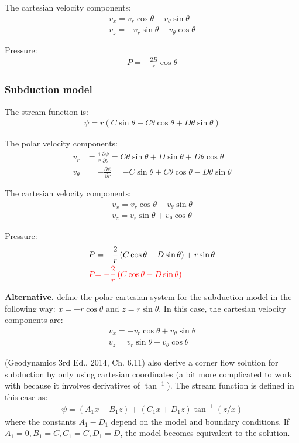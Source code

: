 \documentclass[a4paper,11pt]{article}
\newcommand{\red}[1]{\textcolor{red}{#1}}
\begin{document}
The cartesian velocity components:
\begin{align}
v_x = v_r\cos\theta - v_\theta\sin\theta\\
v_z = -v_r\sin\theta - v_\theta\cos\theta
\end{align}

Pressure:
\begin{align}
P= -\frac{2B}{r}\cos\theta
\end{align}

\subsubsection{Subduction model}
The stream function is:
\begin{align}
\psi = r(C\sin\theta-C\theta\cos\theta+D\theta\sin\theta)
\end{align}

The polar velocity components:
\begin{align}
 v_r&= \frac{1}{r}\frac{\partial\psi}{\partial\theta} = C\theta\sin\theta+D\sin\theta+D\theta\cos\theta\\
v_\theta&=-\frac{\partial\psi}{\partial r} = -C\sin\theta+C\theta\cos\theta-D\theta\sin\theta
 \end{align}
 
The cartesian velocity components:
\begin{align}
v_x = v_r\cos\theta - v_\theta\sin\theta\\
v_z = v_r\sin\theta + v_\theta\cos\theta
\end{align}

Pressure:
\begin{align}
P &= -\frac{2}{r}\left(C\cos\theta-D\sin\theta\right)+r\sin\theta \\
\red{P } &\red{= -\frac{2}{r}\left(C\cos\theta-D\sin\theta\right)}
\end{align}

\textbf{Alternative.} \citet{Spiegelman1987} define the polar-cartesian system for the subduction model in the following way: $x=-r\cos\theta$ and $z=r\sin\theta$. In this case, the cartesian velocity components are:
\begin{align}
v_x = -v_r\cos\theta + v_\theta\sin\theta\\
v_z = v_r\sin\theta + v_\theta\cos\theta
\end{align}

\citet{Turcotte2014} (Geodynamics 3rd Ed., 2014, Ch. 6.11) also derive a corner flow solution for subduction by only using cartesian coordinates (a bit more complicated to work with because it involves derivatives of $\tan^{-1}$). The stream function is defined in this case as:
\begin{align}
\psi = (A_1x+B_1z)+(C_1x+D_1z)\tan^{-1}(z/x)
\end{align}
where the constants $A_1-D_1$ depend on the model and boundary conditions. If $A_1=0, B_1=C, C_1=C, D_1=D$, the model becomes equivalent to the \citet{Spiegelman1987} solution.
\end{document}
